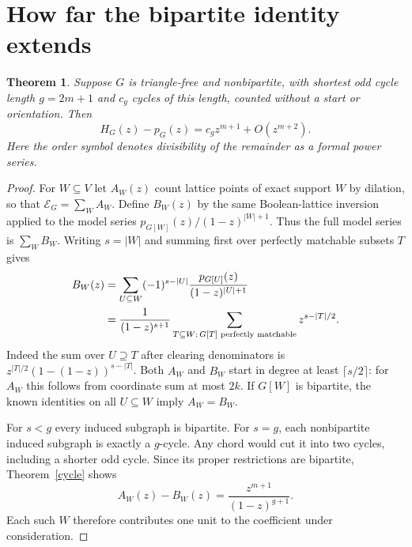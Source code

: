 \documentclass[11pt]{article}
\newtheorem{theorem}{Theorem}[section]
\newcommand{\EE}{\mathcal E}
\begin{document}
\section{How far the bipartite identity extends}
\begin{theorem}\label{odd}
Suppose $G$ is triangle-free and nonbipartite, with shortest odd cycle length $g=2m+1$ and $c_g$ cycles of this length, counted without a start or orientation. Then
\[
 H_G(z)-p_G(z)=c_gz^{m+1}+O(z^{m+2}) .
\]
Here the order symbol denotes divisibility of the remainder as a formal power series.
\end{theorem}
\begin{proof}
For $W\subseteq V$ let $A_W(z)$ count lattice points of exact support $W$ by dilation, so that $\EE_G=\sum_W A_W$. Define $B_W(z)$ by the same Boolean-lattice inversion applied to the model series $p_{G[W]}(z)/(1-z)^{|W|+1}$. Thus the full model series is $\sum_W B_W$. Writing $s=|W|$ and summing first over perfectly matchable subsets $T$ gives
\begin{align}
 B_W(z)&=\sum_{U\subseteq W}(-1)^{s-|U|}\frac{p_{G[U]}(z)}{(1-z)^{|U|+1}}\notag\\
 &=\frac{1}{(1-z)^{s+1}}\sum_{T\subseteq W:\, G[T]\text{ perfectly matchable}}z^{s-|T|/2}. \label{model}
\end{align}
Indeed the sum over $U\supseteq T$ after clearing denominators is $z^{|T|/2}(1-(1-z))^{s-|T|}$. Both $A_W$ and $B_W$ start in degree at least $\lceil s/2\rceil$: for $A_W$ this follows from coordinate sum at most $2k$. If $G[W]$ is bipartite, the known identities on all $U\subseteq W$ imply $A_W=B_W$.

For $s<g$ every induced subgraph is bipartite. For $s=g$, each nonbipartite induced subgraph is exactly a $g$-cycle. Any chord would cut it into two cycles, including a shorter odd cycle. Since its proper restrictions are bipartite, Theorem~\ref{cycle} shows
\[
 A_W(z)-B_W(z)=\frac{z^{m+1}}{(1-z)^{g+1}} .
\]
Each such $W$ therefore contributes one unit to the coefficient under consideration.


\end{proof}
\end{document}
